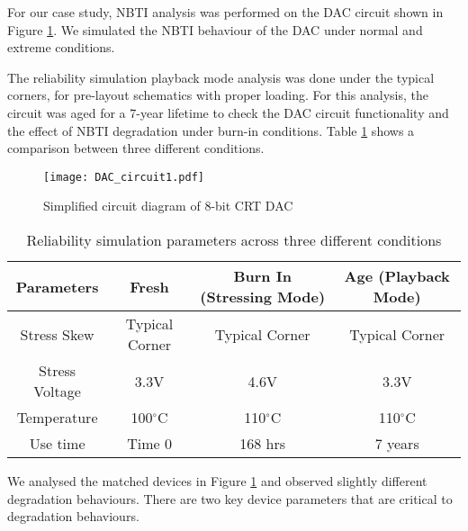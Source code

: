 \documentclass[11pt,a4paper]{article}
\begin{document}
For our case study, NBTI analysis was performed on the DAC circuit shown in Figure \ref{figure6}.  We simulated the NBTI behaviour of the DAC  under normal and extreme conditions. 

   
The reliability simulation playback mode analysis was done under the typical corners, for pre-layout schematics with proper loading. For this analysis, the circuit was aged for a 7-year lifetime to check the DAC circuit functionality and the effect of NBTI degradation under burn-in conditions. Table \ref{table1} shows a comparison between three different conditions.



\begin{figure}[t]
\centering
\texttt{[image: DAC\_circuit1.pdf]}
\caption{Simplified circuit diagram of 8-bit CRT DAC}
\label{figure6}
\end{figure}
\begin{table}[t]
\centering
\caption{Reliability simulation parameters across three different conditions}
\label{table1}
\begin{tabular}{|c|c|c|c|} \hline
Parameters & Fresh & Burn In (Stressing Mode) & Age (Playback Mode)\\
\hline
Stress Skew & Typical Corner & Typical Corner & Typical Corner \\
Stress Voltage & 3.3V & 4.6V & 3.3V \\
Temperature & 100$^\circ$C & 110$^\circ$C & 110$^\circ$C\\
Use time & Time 0 & 168 hrs & 7 years \\
\hline
\end{tabular}

\end{table}

We analysed the matched devices in Figure \ref{figure6} and observed slightly different degradation behaviours. There are two key device parameters that are critical to degradation behaviours.
\end{document}
